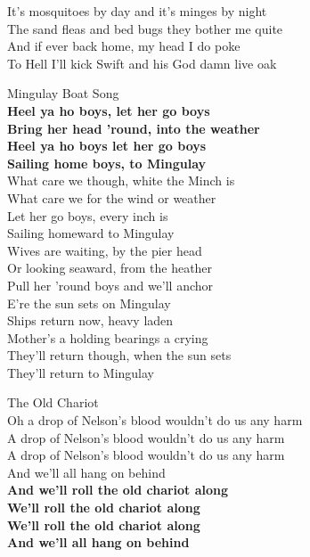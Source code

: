 \documentclass[letterpaper,9pt]{article}
\begin{document}
It's mosquitoes by day and it's minges by night \\
The sand fleas and bed bugs they bother me quite \\
And if ever back home, my head I do poke \\
To Hell I'll kick Swift and his God damn live oak \\

\newpage
{}
\Huge
Mingulay Boat Song\\

\huge
\textbf{Heel ya ho boys, let her go boys \\
Bring her head 'round, into the weather \\
Heel ya ho boys let her go boys \\
Sailing home boys, to Mingulay} \\

What care we though, white the Minch is \\
What care we for the wind or weather \\
Let her go boys, every inch is \\
Sailing homeward to Mingulay \\

Wives are waiting, by the pier head \\
Or looking seaward, from the heather \\
Pull her 'round boys and we'll anchor \\
E're the sun sets on Mingulay \\

Ships return now, heavy laden \\
Mother's a holding bearings a crying \\
They'll return though, when the sun sets \\
They'll return to Mingulay \\

\newpage
{}
\Huge
The Old Chariot\\

\Large
Oh a drop of Nelson's blood wouldn't do us any harm \\
A drop of Nelson's blood wouldn't do us any harm \\
A drop of Nelson's blood wouldn't do us any harm \\
And we'll all hang on behind \\

\textbf{And we'll roll the old chariot along \\
We'll roll the old chariot along \\
We'll roll the old chariot along \\
And we'll all hang on behind} \\
\end{document}
